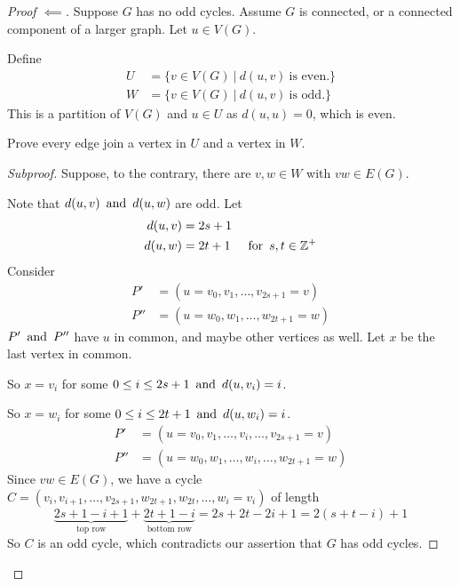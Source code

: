 \begin{proof}[Proof $\impliedby$]
    Suppose $G$ has no odd cycles. Assume $G$ is connected, or a connected component of a larger graph. Let $u \in V(G)$.

    Define
    \begin{align*}
        U & = \{v \in V(G) ~|~ d(u,v) ~\text{is even.}\} \\
        W & = \{v \in V(G) ~|~ d(u,v) ~\text{is odd.}\}
    \end{align*}
    This is a partition of $V(G)$ and $u \in U$ as $d(u,u) = 0$, which is even.

    Prove every edge join a vertex in $U$ and a vertex in $W$.
    \begin{proof}[Subproof]
        Suppose, to the contrary, there are $v,w \in W$ with $vw \in E(G)$.

        Note that $d(u,v) \operatorname{~\text{and}~} d(u,w)$ are odd. Let
        \begin{align*}
            d(u,v) & = 2s+1                          \\
            d(u,w) & = 2t+1 & \operatorname{~\text{for}~} s,t \in \mathbb{Z}^+
        \end{align*}
        Consider
        \begin{align*}
            P'  & = (u=v_0,v_1,\ldots,v_{2s+1} = v) \\
            P'' & = (u=w_0,w_1,\ldots,w_{2t+1} = w)
        \end{align*}
        $P' \operatorname{~\text{and}~} P''$ have $u$ in common, and maybe other vertices as well. Let $x$ be the last vertex in common.

        So $x=v_i$ for some $0 \leq i \leq 2s+1 \operatorname{~\text{and}~} d(u,v_i) = i$.

        So $x=w_i$ for some $0 \leq i \leq 2t+1 \operatorname{~\text{and}~} d(u,w_i) = i$.
        \begin{align*}
            P'  & = (u=v_0,v_1,\ldots,v_i,\ldots,v_{2s+1} = v) \\
            P'' & = (u=w_0,w_1,\ldots,w_i,\ldots,w_{2t+1} = w)
        \end{align*}
        Since $vw \in E(G)$, we have a cycle $C = (v_i,v_{i+1},\ldots,v_{2s+1},w_{2t+1},w_{2t},\ldots,w_i=v_i)$ of length
        \[
            \underbrace{2s+1-i+1}_\text{top row} + \underbrace{2t+1-i}_\text{bottom row} = 2s + 2t - 2i + 1 = 2(s+t-i)+1
        \]
        So $C$ is an odd cycle, which contradicts our assertion that $G$ has  odd cycles.
    \end{proof}
\end{proof}

